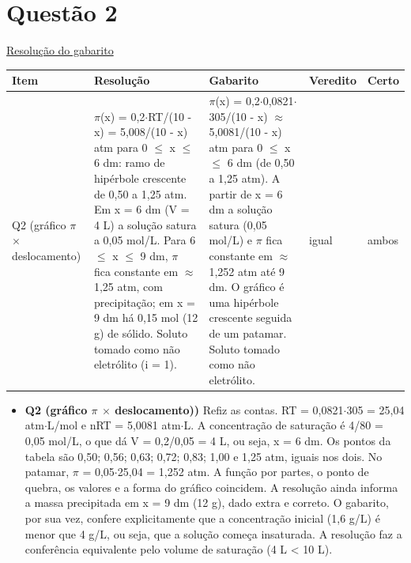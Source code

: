 \documentclass{article}%
\begin{document}
\section*{Questão 2}%
\href{https://poliedroresolve.sistemapoliedro.com.br/vestibulares/ita/2027/ita-2-fase-dia-2-21-10-2026-2-fase-dia-2/dissertativa-2-quimica-2-fase-dia-2-ita-2027}{Resolução do gabarito}\par\smallskip%
\begin{longtable}{@{}p{} p{} p{} p{} p{}@{}}\toprule Item & Resolução & Gabarito & Veredito & Certo \\ \midrule
Q2 (gráfico $\pi$ $\times$ deslocamento) & $\pi$(x) = 0,2$\cdot$RT/(10 - x) = 5,008/(10 - x) atm para 0 $\leq$ x $\leq$ 6 dm: ramo de hipérbole crescente de 0,50 a 1,25 atm. Em x = 6 dm (V = 4 L) a solução satura a 0,05 mol/L. Para 6 $\leq$ x $\leq$ 9 dm, $\pi$ fica constante em $\approx$ 1,25 atm, com precipitação; em x = 9 dm há 0,15 mol (12 g) de sólido. Soluto tomado como não eletrólito (i = 1). & $\pi$(x) = 0,2$\cdot$0,0821$\cdot$305/(10 - x) $\approx$ 5,0081/(10 - x) atm para 0 $\leq$ x $\leq$ 6 dm (de 0,50 a 1,25 atm). A partir de x = 6 dm a solução satura (0,05 mol/L) e $\pi$ fica constante em $\approx$ 1,252 atm até 9 dm. O gráfico é uma hipérbole crescente seguida de um patamar. Soluto tomado como não eletrólito. & igual & ambos \\
\bottomrule\end{longtable}%
\begin{itemize}%
\item%
\textbf{Q2 (gráfico $\pi$ $\times$ deslocamento))} Refiz as contas. RT = 0,0821$\cdot$305 = 25,04 atm$\cdot$L/mol e nRT = 5,0081 atm$\cdot$L. A concentração de saturação é 4/80 = 0,05 mol/L, o que dá V = 0,2/0,05 = 4 L, ou seja, x = 6 dm. Os pontos da tabela são 0,50; 0,56; 0,63; 0,72; 0,83; 1,00 e 1,25 atm, iguais nos dois. No patamar, $\pi$ = 0,05$\cdot$25,04 = 1,252 atm. A função por partes, o ponto de quebra, os valores e a forma do gráfico coincidem. A resolução ainda informa a massa precipitada em x = 9 dm (12 g), dado extra e correto. O gabarito, por sua vez, confere explicitamente que a concentração inicial (1,6 g/L) é menor que 4 g/L, ou seja, que a solução começa insaturada. A resolução faz a conferência equivalente pelo volume de saturação (4 L < 10 L).%
\end{itemize}%
\end{document}
